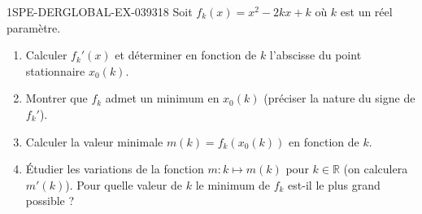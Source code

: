 \begin{exercice}{1SPE-DERGLOBAL-EX-039}{3}{18}
Soit $f_k(x) = x^2 - 2kx + k$ où $k$ est un réel paramètre.

\begin{enumerate}
\item Calculer $f_k'(x)$ et déterminer en fonction de $k$ l'abscisse du point stationnaire $x_0(k)$.
\item Montrer que $f_k$ admet un minimum en $x_0(k)$ (préciser la nature du signe de $f_k'$).
\item Calculer la valeur minimale $m(k) = f_k(x_0(k))$ en fonction de $k$.
\item Étudier les variations de la fonction $m : k \mapsto m(k)$ pour $k \in \mathbb{R}$ (on calculera $m'(k)$). Pour quelle valeur de $k$ le minimum de $f_k$ est-il le plus grand possible ?
\end{enumerate}
\end{exercice}
